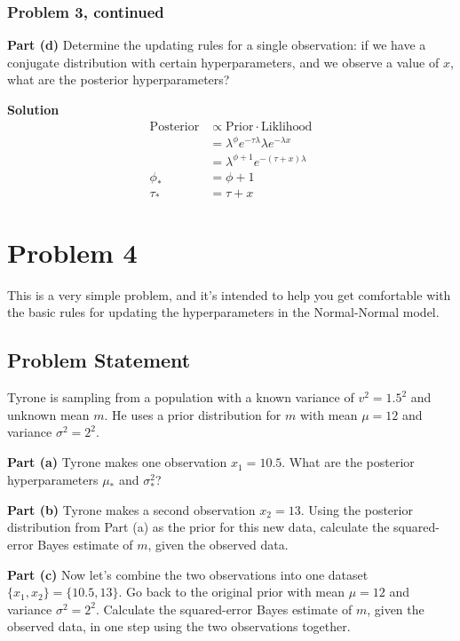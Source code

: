 \documentclass[12pt]{article}
\theoremstyle{definition}
\begin{document}
\subsubsection*{Problem 3, continued}

\noindent
{\bf Part (d)} Determine the updating rules for a single observation: if we have a conjugate distribution with certain hyperparameters, and we observe a value of $x$, what are the posterior hyperparameters? 

\bigskip
\noindent
{\bf Solution}
\begin{align*}
\text{Posterior} &\propto \text{Prior}\cdot\text{Liklihood}\\
&= \lambda^\phi e^{-\tau\lambda}\lambda e^{-\lambda x}\\
&= \lambda^{\phi + 1} e^{-(\tau + x)\lambda}\\
\phi_* &= \phi + 1\\
\tau_* &= \tau + x
\end{align*}






\newpage
\section*{Problem 4}

This is a very simple problem, and it's intended to help you get comfortable with the basic rules for updating the hyperparameters in the Normal-Normal model.


\subsection*{Problem Statement}

Tyrone is sampling from a population with a known variance of $v^2 = 1.5^2$ and unknown mean $m$. He uses a prior distribution for $m$ with mean $\mu = 12$ and variance $\sigma^2 = 2^2$.

\bigskip
\noindent
{\bf Part (a)} Tyrone makes one observation $x_1 = 10.5$. What are the posterior hyperparameters $\mu_*$ and $\sigma_*^2$?

\bigskip
\noindent
{\bf Part (b)} Tyrone makes a second observation $x_2 = 13$. Using the posterior distribution from Part (a) as the prior for this new data, calculate the squared-error Bayes estimate of $m$, given the observed data.

\bigskip
\noindent
{\bf Part (c)} Now let's combine the two observations into one dataset $\{x_1, x_2\} = \{10.5, 13\}$. Go back to the original prior with mean $\mu = 12$ and variance $\sigma^2 = 2^2$. Calculate the squared-error Bayes estimate of $m$, given the observed data, in one step using the two observations together.
\end{document}
